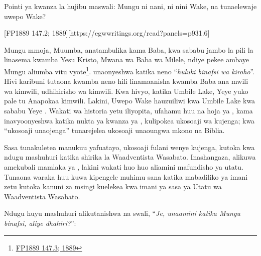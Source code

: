 



Pointi ya kwanza la  hujibu maswali: Mungu ni nani, ni nini  Wake, na tunaelewaje uwepo Wake?


[FP1889 147.2; 1889][https://egwwritings.org/read?panels=p931.6]


Mungu mmoja, Muumba, anatambulika kama Baba, kwa sababu jambo la pili la  linasema kwamba Yesu Kristo, Mwana wa Baba wa Milele, ndiye pekee ambaye Mungu aliumba vitu vyote\footnote{\href{https://egwwritings.org/?ref=en_FP1889.147.3&para=931.7}{FP1889 147.3; 1889}}.  unaonyeshwa katika neno “\textit{huluki binafsi wa kiroho}”. Hivi karibuni tutaona kwamba neno hili linamaanisha kwamba Baba ana mwili wa kimwili, udhihirisho wa kimwili. Kwa hivyo, katika Umbile Lake, Yeye yuko pale tu Anapokaa kimwili. Lakini, Uwepo Wake hauzuiliwi kwa Umbile Lake kwa sababu Yeye . Wakati wa historia yetu iliyopita, ufahamu huu na hoja ya , kama inavyoonyeshwa katika nukta ya kwanza ya , kulipokea ukosoaji wa kujenga; kwa “ukosoaji unaojenga” tunarejelea ukosoaji unaoungwa mkono na Biblia.


Sasa tunakuletea manukuu yafuatayo, ukosoaji fulani wenye kujenga, kutoka kwa ndugu mashuhuri katika shirika la Waadventista Wasabato. Inashangaza, alikuwa amekubali mamlaka ya , lakini wakati huo huo aliamini mafundisho ya utatu. Tunaona waraka huu kuwa kipengele muhimu sana katika mabadiliko ya imani zetu kutoka kanuni za msingi kuelekea kwa imani ya sasa ya Utatu wa Waadventista Wasabato.


Ndugu huyu mashuhuri alikutanishwa na swali, “\textit{Je, unaamini katika Mungu binafsi, aliye dhahiri?}”:




